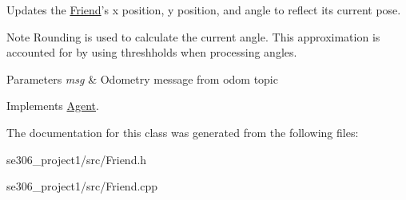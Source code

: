 Updates the \hyperlink{classFriend}{Friend}'s x position, y position, and angle to reflect its current pose. 

\begin{DoxyNote}{Note}
Rounding is used to calculate the current angle. This approximation is accounted for by using threshholds when processing angles. 
\end{DoxyNote}

\begin{DoxyParams}{Parameters}
{\em msg} & Odometry message from odom topic \\
\hline
\end{DoxyParams}


Implements \hyperlink{classAgent_a4b1182b9ee5dccaa871d71beef94a7d2}{Agent}.



The documentation for this class was generated from the following files\-:\begin{DoxyCompactItemize}
\item 
se306\-\_\-project1/src/Friend.\-h\item 
se306\-\_\-project1/src/Friend.\-cpp\end{DoxyCompactItemize}
